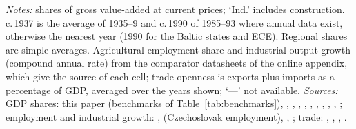 \begin{table}[htbp]
\begin{threeparttable}
\begin{tablenotes}
\footnotesize
\textit{Notes:} shares of gross value-added at current prices; `Ind.' includes construction. c.\,1937 is the average of 1935--9 and c.\,1990 of 1985--93 where annual data exist, otherwise the nearest year (1990 for the Baltic states and ECE). Regional shares are simple averages. Agricultural employment share and industrial output growth (compound annual rate) from the comparator datasheets of the online appendix, which give the source of each cell; trade openness is exports plus imports as a percentage of GDP, averaged over the years shown; `---' not available. \textit{Sources:} GDP shares: this paper (benchmarks of Table~\ref{tab:benchmarks}), \textcite{klimantas2019}, \textcite{klimantas2025estonia}, \textcite[179]{morysinterwarinmorys2021}, \textcite{mitchelstat}, \textcite[158]{portugal_economy}, \textcite[24]{jonsson1999}, \textcite[460]{ivanov2012gdp}, \textcite[184]{bolotin1992}, \textcite[182]{un_yearbook1993}, \textcite[346]{cameh_sectoral1945}; employment and industrial growth: \textcite{mitchelstat}, \textcite[181]{morysinterwarinmorys2021} (Czechoslovak employment), \textcite[2]{ostlandinzahlen}, \textcite[86]{east_industry_periphery1871}; trade: \textcite{lidaexportslv,lidaimportslv}, \textcite{worldtrade1949}, \textcite[122, 155]{balticstates1938}, \textcite[21]{jonsson1999}.
\end{tablenotes}
\end{threeparttable}
\end{table}
